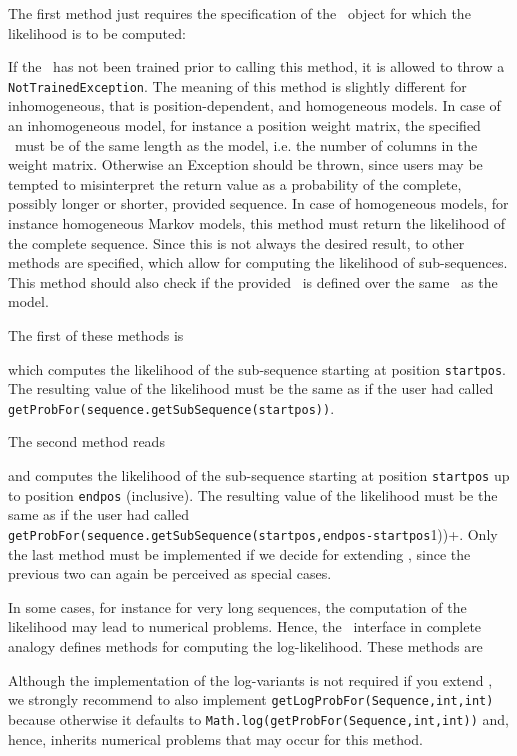The first method just requires the specification of the \Sequence~object for which the likelihood is to be computed:
\addtocounter{off}{24}
If the \TrainSM~has not been trained prior to calling this method, it is allowed to throw a \lstinline+NotTrainedException+. The meaning of this method is slightly different for inhomogeneous, that is position-dependent, and homogeneous models. In case of an inhomogeneous model, for instance a position weight matrix, the specified \Sequence~must be of the same length as the model, i.e. the number of columns in the weight matrix. Otherwise an Exception should be thrown, since users may be tempted to misinterpret the return value as a probability of the complete, possibly longer or shorter, provided sequence.
In case of homogeneous models, for instance homogeneous Markov models, this method must return the likelihood of the complete sequence. Since this is not always the desired result, to other methods are specified, which allow for computing the likelihood of sub-sequences. This method should also check if the provided \Sequence~is defined over the same \AlphabetContainer~as the model.

The first of these methods is
\addtocounter{off}{37}
which computes the likelihood of the sub-sequence starting at position \lstinline+startpos+. The resulting value of the likelihood must be the same as if the user had called \lstinline+getProbFor(sequence.getSubSequence(startpos))+.

The second method reads
\addtocounter{off}{40}
and computes the likelihood of the sub-sequence starting at position \lstinline+startpos+ up to position \lstinline+endpos+ (inclusive). The resulting value of the likelihood must be the same as if the user had called \lstinline+getProbFor(sequence.getSubSequence(startpos,endpos-startpos+1))+.
Only the last method must be implemented if we decide for extending \AbstractTrainSM, since the previous two can again be perceived as special cases.

In some cases, for instance for very long sequences, the computation of the likelihood may lead to numerical problems. Hence, the \TrainSM~interface in complete analogy defines methods for computing the log-likelihood. These methods are
\addtocounter{off}{32}
\addtocounter{off}{28}
\addtocounter{off}{28}
Although the implementation of the log-variants is not required if you extend \AbstractTrainSM, we strongly recommend to also implement \lstinline+getLogProbFor(Sequence,int,int)+ because otherwise it defaults to \lstinline+Math.log(getProbFor(Sequence,int,int))+ and, hence, inherits numerical problems that may occur for this method.

